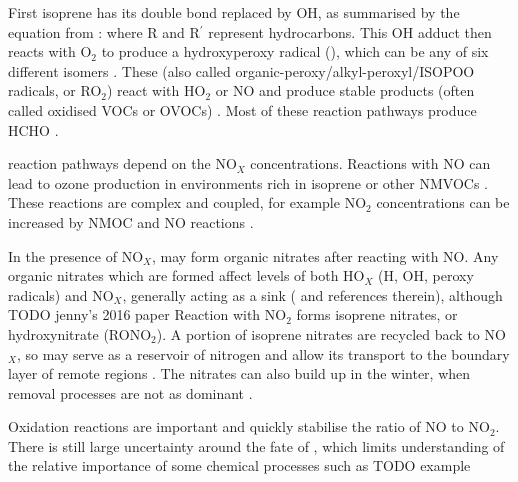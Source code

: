       First isoprene has its double bond replaced by OH, as summarised by the equation from \textcite{Patchen2007}:
      where R and R$^{\prime}$ represent hydrocarbons.
      This OH adduct then reacts with O$_2$ to produce a hydroxyperoxy radical (\roo), which can be any of six different isomers \parencite{Patchen2007}.
      These \roo (also called organic-peroxy/alkyl-peroxyl/ISOPOO radicals, or RO$_2$)  react with HO$_2$ or NO and produce stable products (often called oxidised VOCs or OVOCs) \parencite{Nguyen2014}.
      Most of these reaction pathways produce HCHO \parencite{Wolfe2016}.
      
      \roo reaction pathways depend on the NO$_X$ concentrations.                               
      Reactions with NO can lead to ozone production in environments rich in isoprene or other  NMVOCs \parencite{Patchen2007,AtkinsonArey2003}.
      These reactions are complex and coupled, for example NO$_2$ concentrations can be increased by NMOC and NO reactions \parencite{AtkinsonArey2003}.
          
      In the presence of NO$_X$, \roo may form organic nitrates after reacting with NO.
      Any organic nitrates which are formed affect levels of both HO$_X$ (H, OH, peroxy radicals) and NO$_X$, generally acting as a sink (\textcite{Mao2013} and references therein), although TODO jenny's 2016 paper%
      Reaction with NO$_2$ forms isoprene nitrates, or hydroxynitrate (RONO$_2$).
      A portion of isoprene nitrates are recycled back to NO$_X$, so may serve as a reservoir of nitrogen and allow its transport to the boundary layer of remote regions \parencite{Patchen2007,Paulot2009a}.
      The nitrates can also build up in the winter, when removal processes are not as dominant \parencite{Lelieveld2009}.
      
      
      Oxidation reactions are important and quickly stabilise the ratio of NO to NO$_2$. 
      There is still large uncertainty around the fate of \roo, which limits understanding of the relative importance of some chemical processes such as TODO example %
    
